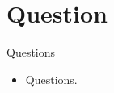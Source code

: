\documentclass[12pt,aspectratio=1610]{beamer}
\begin{document}
\section{Question}

\begin{frame}{Questions}
	\begin{itemize}
		\item Questions.
	\end{itemize}
\end{frame}





\end{document}
